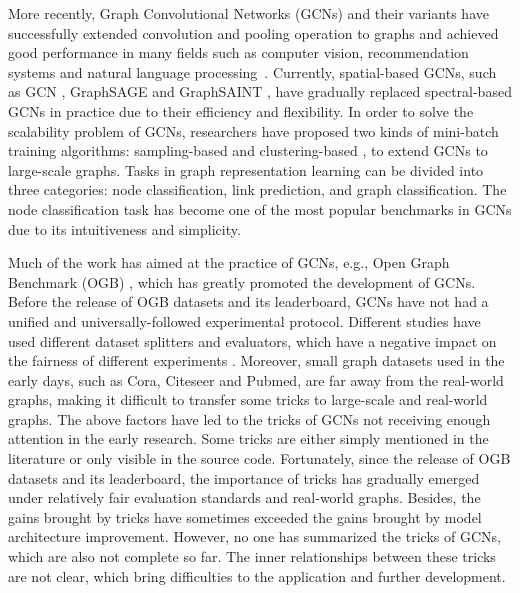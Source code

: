 \documentclass[runningheads]{llncs}
\begin{document}
More recently, Graph Convolutional Networks (GCNs) and their variants have successfully extended
convolution and pooling operation to graphs and achieved good
performance in many fields such as computer vision, recommendation
systems and natural language processing~\cite{wu2020comprehensive}. Currently, spatial-based GCNs, such as GCN \cite{kipf2016semi}, GraphSAGE \cite{hamilton2017inductive} and
GraphSAINT \cite{zeng2019graphsaint}, have gradually replaced spectral-based GCNs in practice due to their
efficiency and flexibility. In order to solve the scalability problem of GCNs, researchers have proposed two kinds of mini-batch training algorithms:
sampling-based \cite{hamilton2017inductive,zeng2019graphsaint,chen2018fastgcn} and clustering-based \cite{chiang2019cluster}, to extend GCNs to large-scale graphs. Tasks in graph
representation learning can be divided into three categories: node
classification, link prediction, and graph classification. The node
classification task has become one of the most popular benchmarks
in GCNs due to its intuitiveness and simplicity.

Much of the work has aimed at the practice of GCNs, e.g., Open Graph Benchmark (OGB) \cite{hu2020open}, which has greatly promoted the development 
of GCNs. Before the release of OGB datasets and its leaderboard, GCNs
have not had a unified and universally-followed experimental protocol.
Different studies have used different dataset splitters and
evaluators, which have a negative impact on the fairness of different experiments \cite{shchur2018pitfalls,errica2019fair}. Moreover, small graph datasets used
in the early days, such as Cora, Citeseer and Pubmed, are far away from the real-world graphs, making it
difficult to transfer some tricks to
large-scale and real-world graphs. The above factors have led to the  tricks of GCNs not
receiving enough attention in the early research. Some tricks are
either simply mentioned in the literature or only visible in the source code.
Fortunately, since the release of OGB datasets and its leaderboard, the importance
of tricks has gradually emerged under relatively fair evaluation
standards and real-world graphs. Besides, the gains brought by tricks have sometimes exceeded
the gains brought by model architecture improvement. However, no one has summarized the tricks of GCNs, which are also not complete so
far. The inner relationships between these tricks are
not clear, which bring difficulties to the application and further
development.
\end{document}
